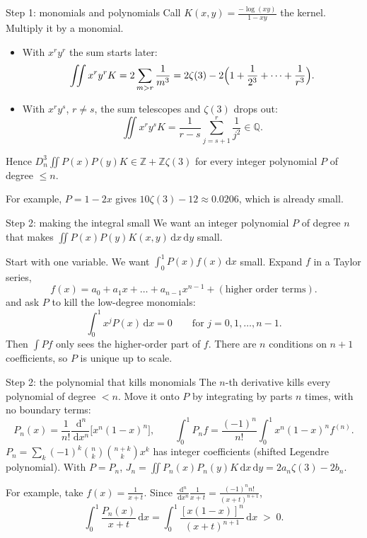 \documentclass[aspectratio=169,11pt]{beamer}
\newcommand{\Z}{\mathbb{Z}}
\newcommand{\dd}{\,\mathrm{d}}
\newcommand{\Dn}{D_n}
\begin{document}
\begin{frame}{Step 1: monomials and polynomials}
  Call $K(x,y)=\frac{-\log(xy)}{1-xy}$ the \alert{kernel}. Multiply it by a monomial.
  \begin{itemize}
    \item With $x^ry^r$ the sum starts later:
      \[
        \iint x^ry^rK=2\sum_{m>r}\frac1{m^3}=2\zeta(3)-2\Bigl(1+\frac1{2^3}+\dots+\frac1{r^3}\Bigr).
      \]
    \item With $x^ry^s$, $r\ne s$, the sum telescopes and $\zeta(3)$ drops out:
      \[
        \iint x^ry^sK=\frac1{r-s}\sum_{j=s+1}^{r}\frac1{j^2}\in\mathbb Q .
      \]
  \end{itemize}
  Hence $\Dn^3\iint P(x)P(y)K\in\Z+\Z\zeta(3)$ for every integer polynomial $P$ of degree $\le n$.

  For example, $P=1-2x$ gives $10\zeta(3)-12\approx0.0206$, which is already small.
\end{frame}

\begin{frame}{Step 2: making the integral small}
  We want an integer polynomial $P$ of degree $n$ that makes
  $\displaystyle\iint P(x)P(y)K(x,y)\dd x\dd y$ \alert{small}.
  \medskip

  Start with one variable. We want $\int_0^1P(x)f(x)\dd x$ small. Expand $f$ in a Taylor series,
  \[
    f(x)=a_0+a_1x+\dots+a_{n-1}x^{n-1}+(\text{higher order terms}).
  \]
  and ask $P$ to kill the low-degree monomials:
  \[
    \int_0^1x^jP(x)\dd x=0\qquad\text{for } j=0,1,\dots,n-1.
  \]
  Then $\int Pf$ only sees the higher-order part of $f$.
  There are $n$ conditions on $n+1$ coefficients, so $P$ is unique up to scale.
\end{frame}

\begin{frame}{Step 2: the polynomial that kills monomials}
  The $n$-th derivative kills every polynomial of degree $<n$. Move it onto $P$ by integrating by
  parts $n$ times, with no boundary terms:
  \[
    P_n(x)=\frac1{n!}\frac{\dd^n}{\dd x^n}\bigl[x^n(1-x)^n\bigr],\qquad
    \int_0^1P_nf=\frac{(-1)^n}{n!}\int_0^1x^n(1-x)^nf^{(n)} .
  \]
  $P_n=\sum_k(-1)^k\binom nk\binom{n+k}kx^k$ has integer coefficients (shifted Legendre polynomial).
  With $P=P_n$,\quad
  $J_n=\iint P_n(x)P_n(y)K\dd x\dd y=2a_n\zeta(3)-2b_n$.
  \medskip

  For example, take $f(x)=\frac1{x+t}$. Since
  $\frac{\dd^n}{\dd x^n}\frac1{x+t}=\frac{(-1)^nn!}{(x+t)^{n+1}}$,
  \[
    \int_0^1\frac{P_n(x)}{x+t}\dd x=\int_0^1\frac{[x(1-x)]^n}{(x+t)^{n+1}}\dd x\;>\;0 .
  \]
\end{frame}
\end{document}

